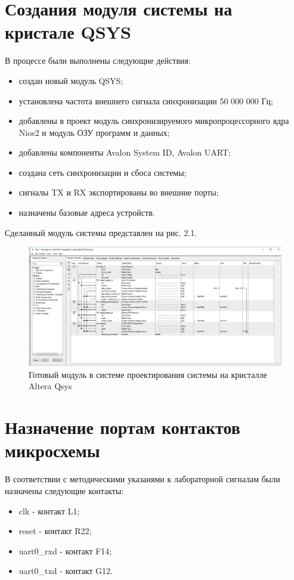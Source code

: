 \chapter{Создания модуля системы на кристале QSYS}

В процессе были выполнены следующие действия:
\begin{itemize}
	\item создан новый модуль QSYS;
	\item установлена частота внешнего сигнала синхронизации 50 000 000 Гц;
	\item добавлены в проект модуль синхронизируемого микропроцессорного ядра Nios2 и модуль ОЗУ программ и данных;
	\item добавлены компоненты Avalon System ID, Avalon UART;
	\item создана сеть синхронизации и сбоса системы;
	\item сигналы TX и RX экспортированы во внешние порты;
	\item назначены базовые адреса устройств.
\end{itemize}

Сделанный модуль системы представлен на рис. 2.1.
\begin{figure}[H]
	\begin{center}
		\includegraphics[scale=0.5]{assets/qsys.png}
	\end{center}
	\caption{Готовый модуль в системе проектирования системы на кристалле Altera Qsys}
\end{figure}

\chapter{Назначение портам контактов микросхемы}

В соответствии с методическими указанями к лабораторной сигналам были назначены следующие контакты:
\begin{itemize}
	\item clk - контакт L1;
	\item reset - контакт R22;
	\item uart0\_{rxd} - контакт F14;
	\item uart0\_{txd} - контакт G12.
\end{itemize}

